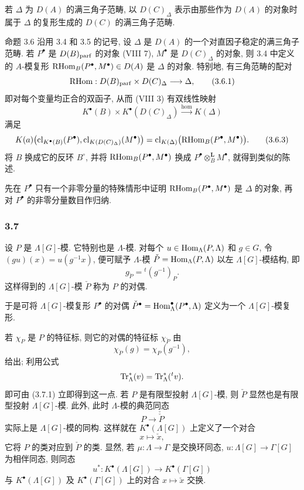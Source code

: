 若 $\Delta$ 为 $D(A)$ 的满三角子范畴, 以 $D(C)_{\Delta}$ 表示由那些作为 $D(A)$ 的对象时属于 $\Delta$ 的复形生成的 $D(C)$ 的满三角子范畴.

\begin{statement}{命题 3.6}
沿用 3.4 和 3.5 的记号, 设 $\Delta$ 是 $D(A)$ 的一个对直因子稳定的满三角子范畴. 若 $P^\bullet$ 是 $D(B)_{\mathrm{parf}}$ 的对象 (VIII 7), $M^\bullet$ 是 $D(C)_{\Delta}$ 的对象, 则 3.4 中定义的 $A$-模复形 $\mathrm{RHom}_B(P^\bullet,M^\bullet)\in D(A)$ 是 $\Delta$ 的对象. 特别地, 有三角范畴的配对
\[
\mathrm{RHom}:D(B)_{\mathrm{parf}}\times D(C)_{\Delta}\longrightarrow \Delta,
\tag{3.6.1}
\]
即对每个变量均正合的双函子, 从而 (VIII 3) 有双线性映射
\[
K^{\bullet}(B)\times K^{\bullet}(D(C)_{\Delta})\xrightarrow{\operatorname{hom}} K(\Delta)
\tag{3.6.2}
\]
满足
\[
K(a)\bigl(\operatorname{cl}_{K^{\bullet}(B)}(P^\bullet),\operatorname{cl}_{K(D(C)_{\Delta})}(M^\bullet)\bigr)
=\operatorname{cl}_{K(\Delta)}\bigl(\mathrm{RHom}_B(P^\bullet,M^\bullet)\bigr).
\tag{3.6.3}
\]
将 $B$ 换成它的反环 $B^\circ$, 并将 $\mathrm{RHom}_B(P^\bullet,M^\bullet)$ 换成 $P^\bullet\otimes_B^{\mathbf L}M^\bullet$, 就得到类似的陈述.
\end{statement}

\begin{prooftext}[证明]
先在 $P^\bullet$ 只有一个非零分量的特殊情形中证明 $\mathrm{RHom}_B(P^\bullet,M^\bullet)$ 是 $\Delta$ 的对象, 再对 $P^\bullet$ 的非零分量数目作归纳.
\end{prooftext}

\subsubsection*{3.7}

设 $P$ 是 $\Lambda[G]$-模. 它特别也是 $\Lambda$-模. 对每个 $u\in\operatorname{Hom}_\Lambda(P,\Lambda)$ 和 $g\in G$, 令 $(gu)(x)=u(g^{-1}x)$, 便可赋予 $\Lambda$-模 $\check P=\operatorname{Hom}_\Lambda(P,\Lambda)$ 以左 $\Lambda[G]$-模结构, 即
\[
g_{\check P}={}^{t}(g^{-1})_P.
\tag{3.7.1}
\]
这样得到的 $\Lambda[G]$-模 $\check P$ 称为 $P$ 的对偶.

于是可将 $\Lambda[G]$-模复形 $P^\bullet$ 的对偶 $\check P^\bullet=\operatorname{Hom}_\Lambda^\bullet(P^\bullet,\Lambda)$ 定义为一个 $\Lambda[G]$-模复形.

若 $\chi_P$ 是 $P$ 的特征标, 则它的对偶的特征标 $\chi_{\check P}$ 由
\[
\chi_{\check P}(g)=\chi_P(g^{-1}),
\tag{3.7.2}
\]
给出; 利用公式
\[
\operatorname{Tr}_\Lambda^*(v)=\operatorname{Tr}_\Lambda^*({}^{t}v).
\]
即可由 (3.7.1) 立即得到这一点. 若 $P$ 是有限型投射 $\Lambda[G]$-模, 则 $\check P$ 显然也是有限型投射 $\Lambda[G]$-模. 此外, 此时 $\Lambda$-模的典范同态
\[
P\longrightarrow\check{\check P}
\]
实际上是 $\Lambda[G]$-模的同构. 这样就在 $K^{\bullet}(\Lambda[G])$ 上定义了一个对合
\[
x\longmapsto \check x,
\]
它将 $P$ 的类对应到 $\check P$ 的类. 显然, 若 $\mu:\Lambda\to\Gamma$ 是交换环同态, $u:\Lambda[G]\to\Gamma[G]$ 为相伴同态, 则同态
\[
u^*:K^{\bullet}(\Lambda[G])\longrightarrow K^{\bullet}(\Gamma[G])
\]
与 $K^{\bullet}(\Lambda[G])$ 及 $K^{\bullet}(\Gamma[G])$ 上的对合 $x\longmapsto\check x$ 交换.

